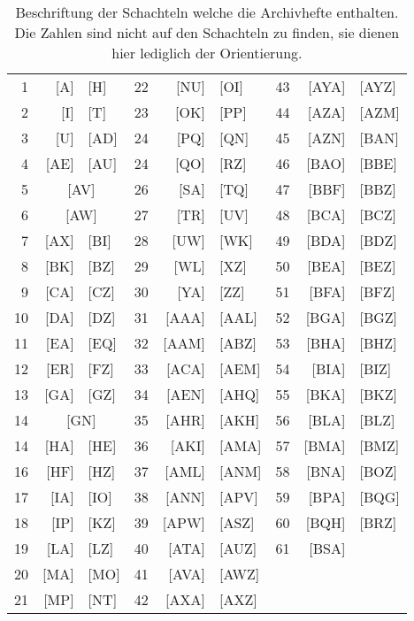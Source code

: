 \begin{table}[ht]
\caption{Beschriftung der Schachteln welche die Archivhefte enthalten. Die Zahlen sind nicht auf den Schachteln zu finden, sie dienen hier lediglich der Orientierung.}
\label{TabelleSchachteln}
\begin{tabular}{rr@{ -- }lrr@{ -- }lrr@{ -- }l}
\\
1  & {[}A{]}&{[}H{]}              & \hspace{15mm}22 & {[}NU{]}&{[}OI{]}   & \hspace{15mm}43 & {[}AYA{]}&{[}AYZ{]} \\
2  & {[}I{]}&{[}T{]}              & 23 & {[}OK{]}&{[}PP{]}   & 44 & {[}AZA{]}&{[}AZM{]} \\
3  & {[}U{]}&{[}AD{]}             & 24 & {[}PQ{]}&{[}QN{]}   & 45 & {[}AZN{]}&{[}BAN{]} \\
4  & {[}AE{]}&{[}AU{]}            & 24 & {[}QO{]}&{[}RZ{]}   & 46 & {[}BAO{]}&{[}BBE{]} \\
5  & \multicolumn{2}{c}{{[}AV{]}} & 26 & {[}SA{]}&{[}TQ{]}   & 47 & {[}BBF{]}&{[}BBZ{]} \\
6  & \multicolumn{2}{c}{{[}AW{]}} & 27 & {[}TR{]}&{[}UV{]}   & 48 & {[}BCA{]}&{[}BCZ{]} \\
7  & {[}AX{]}&{[}BI{]}            & 28 & {[}UW{]}&{[}WK{]}   & 49 & {[}BDA{]}&{[}BDZ{]} \\
8  & {[}BK{]}&{[}BZ{]}            & 29 & {[}WL{]}&{[}XZ{]}   & 50 & {[}BEA{]}&{[}BEZ{]} \\
9  & {[}CA{]}&{[}CZ{]}            & 30 & {[}YA{]}&{[}ZZ{]}   & 51 & {[}BFA{]}&{[}BFZ{]} \\
10 & {[}DA{]}&{[}DZ{]}            & 31 & {[}AAA{]}&{[}AAL{]} & 52 & {[}BGA{]}&{[}BGZ{]} \\
11 & {[}EA{]}&{[}EQ{]}            & 32 & {[}AAM{]}&{[}ABZ{]} & 53 & {[}BHA{]}&{[}BHZ{]} \\
12 & {[}ER{]}&{[}FZ{]}            & 33 & {[}ACA{]}&{[}AEM{]} & 54 & {[}BIA{]}&{[}BIZ{]} \\
13 & {[}GA{]}&{[}GZ{]}            & 34 & {[}AEN{]}&{[}AHQ{]} & 55 & {[}BKA{]}&{[}BKZ{]} \\
14 & \multicolumn{2}{c}{{[}GN{]}} & 35 & {[}AHR{]}&{[}AKH{]} & 56 & {[}BLA{]}&{[}BLZ{]} \\
14 & {[}HA{]}&{[}HE{]}            & 36 & {[}AKI{]}&{[}AMA{]} & 57 & {[}BMA{]}&{[}BMZ{]} \\
16 & {[}HF{]}&{[}HZ{]}            & 37 & {[}AML{]}&{[}ANM{]} & 58 & {[}BNA{]}&{[}BOZ{]} \\
17 & {[}IA{]}&{[}IO{]}            & 38 & {[}ANN{]}&{[}APV{]} & 59 & {[}BPA{]}&{[}BQG{]} \\
18 & {[}IP{]}&{[}KZ{]}            & 39 & {[}APW{]}&{[}ASZ{]} & 60 & {[}BQH{]}&{[}BRZ{]} \\
19 & {[}LA{]}&{[}LZ{]}            & 40 & {[}ATA{]}&{[}AUZ{]} & 61 & {[}BSA{]}&          \\
20 & {[}MA{]}&{[}MO{]}            & 41 & {[}AVA{]}&{[}AWZ{]} & \multicolumn{2}{c}{} \\
21 & {[}MP{]}&{[}NT{]}            & 42 & {[}AXA{]}&{[}AXZ{]} & \multicolumn{2}{c}{}&       
\end{tabular}
\end{table}